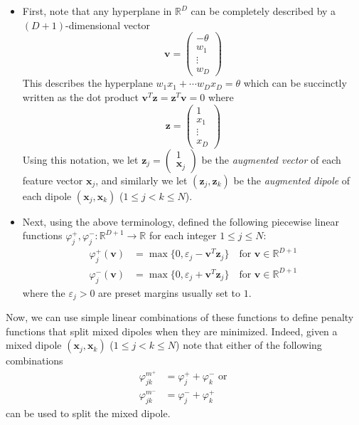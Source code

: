 \documentclass[12pt]{amsart}
\theoremstyle{definition}
\theoremstyle{plain}
\theoremstyle{remark}
\newcommand{\RR}{\mathbb{R}}
\newcommand{\eps}{\varepsilon}
\begin{document}
\begin{itemize}
	\item First, note that any hyperplane in $\RR^D$ can be completely described by a $(D + 1)$-dimensional vector
	$$
	\mathbf{v} = \begin{pmatrix} -\theta \\ w_1 \\ \vdots \\ w_D \end{pmatrix}
	$$ This describes the hyperplane
	$
	w_1 x_1 + \cdots w_D x_D = \theta
	$ which can be succinctly written as the dot product
	$
	\mathbf{v}^T \mathbf{z} = \mathbf{z}^T \mathbf{v} = 0
	$ where 
	$$
	\mathbf{z} = \begin{pmatrix} 1 \\ x_1 \\ \vdots \\ x_D \end{pmatrix}
	$$ Using this notation, we let
	$
	\mathbf{z}_j = \begin{pmatrix} 1 \\ \mathbf{x}_j \end{pmatrix} 
	$ be the \emph{augmented vector} of each feature vector $\mathbf{x}_j$, and similarly we let $
	(\mathbf{z}_j, \mathbf{z}_k) 
	$ be the \emph{augmented dipole} of each dipole $(\mathbf{x}_j, \mathbf{x}_k)$ ($1 \leq j < k \leq N$).
	\item Next, using the above terminology, \cite{bobrowskikretowski} defined the following piecewise linear functions $\varphi^+_j, \varphi^-_j : \RR^{D + 1} \to \RR$ for each integer $1 \leq j \leq N$:
	\begin{align*}
		\varphi^+_j(\mathbf{v}) &= \max\{0, \eps_j - \mathbf{v}^T \mathbf{z}_j\} \quad \text{for }\mathbf{v} \in \RR^{D + 1} \\
		\varphi^-_j(\mathbf{v}) &= \max\{0, \eps_j + \mathbf{v}^T \mathbf{z}_j\} \quad \text{for }\mathbf{v} \in \RR^{D + 1}
	\end{align*} where the $\eps_j > 0$ are preset margins usually set to $1$.
\end{itemize}

Now, we can use simple linear combinations of these functions to define penalty functions that split mixed dipoles when they are minimized. Indeed, given a mixed dipole $(\mathbf{x}_j, \mathbf{x}_k)$ ($1 \leq j < k \leq N$) note that either of the following combinations
\begin{align*}
	\varphi^{m^+}_{jk} &= \varphi^+_j + \varphi^-_k \text{ or } \\
	\varphi^{m^-}_{jk} &= \varphi^-_j + \varphi^+_k
\end{align*} can be used to split the mixed dipole. \\
\end{document}
